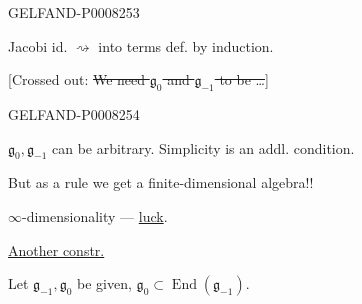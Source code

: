 \begin{GelfandAdjacentEvidence}{GELFAND-P000825}{3}


Jacobi id. \(\rightsquigarrow\) into terms def. by induction.

[Crossed out: \sout{We need \(\mathfrak g_0\) and \(\mathfrak g_{-1}\) to be …}]
\end{GelfandAdjacentEvidence}
\begin{GelfandAdjacentEvidence}{GELFAND-P000825}{4}


\end{GelfandAdjacentEvidence}


\(\mathfrak g_0,\mathfrak g_{-1}\) can be arbitrary. Simplicity is an addl. condition.

But as a rule we get a finite-dimensional algebra!!

\(\infty\)-dimensionality — \uline{luck}.

\uline{Another constr.}

Let \(\mathfrak g_{-1},\mathfrak g_0\) be given,\qquad
\(\mathfrak g_0\subset\operatorname{End}(\mathfrak g_{-1})\).


